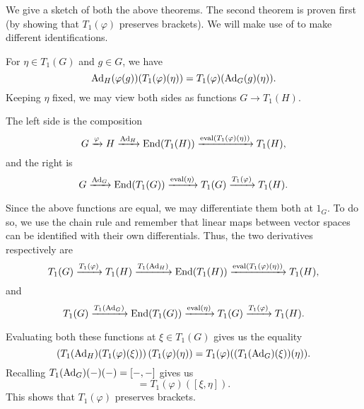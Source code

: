 \documentclass[12pt]{article}
\begin{document}
\begin{sketch}
	We give a sketch of both the above theorems. 
	The second theorem is proven first (by showing that $T_{1}(\varphi)$ preserves brackets). 
	We will make use of  to make different identifications.

	For $\eta \in T_{1}(G)$ and $g \in G$, we have
	\begin{equation*} 
		\operatorname{Ad}_{H}(\varphi(g))(T_{1}(\varphi)(\eta)) = T_{1}(\varphi)(\operatorname{Ad}_{G}(g)(\eta)).
	\end{equation*}
	Keeping $\eta$ fixed, we may view both sides as functions $G \to T_{1}(H)$.

	The left side is the composition
	\begin{equation*} 
		G \xrightarrow{\varphi} H \xrightarrow{\operatorname{Ad}_{H}} \operatorname{End}(T_{1}(H)) \xrightarrow{\operatorname{eval}(T_{1}(\varphi)(\eta))} T_{1}(H),
	\end{equation*}
	and the right is
	\begin{equation*} 
		G \xrightarrow{\operatorname{Ad}_{G}} \operatorname{End}(T_{1}(G)) \xrightarrow{\operatorname{eval}(\eta)} T_{1}(G) \xrightarrow{T_{1}(\varphi)} T_{1}(H).
	\end{equation*}

	Since the above functions are equal, we may differentiate them both at $1_{G}$. 
	To do so, we use the chain rule and remember that linear maps between vector spaces can be identified with their own differentials. 
	Thus, the two derivatives respectively are
	\begin{equation*} 
		T_{1}(G) \xrightarrow{T_{1}(\varphi)} T_{1}(H) \xrightarrow{T_{1}(\operatorname{Ad}_{H})} \operatorname{End}(T_{1}(H)) \xrightarrow{\operatorname{eval}(T_{1}(\varphi)(\eta))} T_{1}(H),
	\end{equation*}
	and
	\begin{equation*} 
		T_{1}(G) \xrightarrow{T_{1}(\operatorname{Ad}_{G})} \operatorname{End}(T_{1}(G)) \xrightarrow{\operatorname{eval}(\eta)} T_{1}(G) \xrightarrow{T_{1}(\varphi)} T_{1}(H).
	\end{equation*}

	Evaluating both these functions at $\xi \in T_{1}(G)$ gives us the equality
	\begin{equation*} 
		\left(T_{1}(\operatorname{Ad}_{H})(T_{1}(\varphi)(\xi))\right)\left(T_{1}(\varphi)(\eta)\right) = T_{1}(\varphi)((T_{1}(\operatorname{Ad}_{G})(\xi))(\eta)).
	\end{equation*}
	Recalling $T_{1}(\operatorname{Ad}_{G})(-)(-) = [-, -]$ gives us
	\begin{equation*} 
		[T_{1}(\varphi)(\xi), T_{1}(\varphi)(\eta)] = T_{1}(\varphi)([\xi, \eta]).
	\end{equation*}
	This shows that $T_{1}(\varphi)$ preserves brackets.


\end{sketch}
\end{document}
